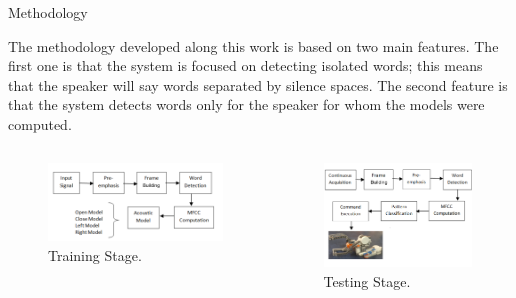 \documentclass[final]{beamer}
\begin{document}
\begin{frame}{}
\begin{textblock}{39.5}
\begin{block}{Methodology}

The methodology developed along this work is based on two main features. The first one is that the system is focused on detecting isolated words; this means that the speaker will say words separated by silence spaces. The second feature is that the system detects words only for the speaker for whom the models were computed.

\begin{columns}[t]
\centering
\begin{figure}
	\includegraphics[width=0.8\linewidth]{figs/1bloquesTraining}
    \caption{Training Stage.}
	\label{trainingBlocks}
	\end{figure}
\centering
\begin{figure}	
    \includegraphics[width=0.8\linewidth]{figs/11bloquesTesting}
    \caption{Testing Stage.}
	\label{trainingBlocks}


\end{figure}
\end{columns}
\end{block}
\end{textblock}
\end{frame}
\end{document}

